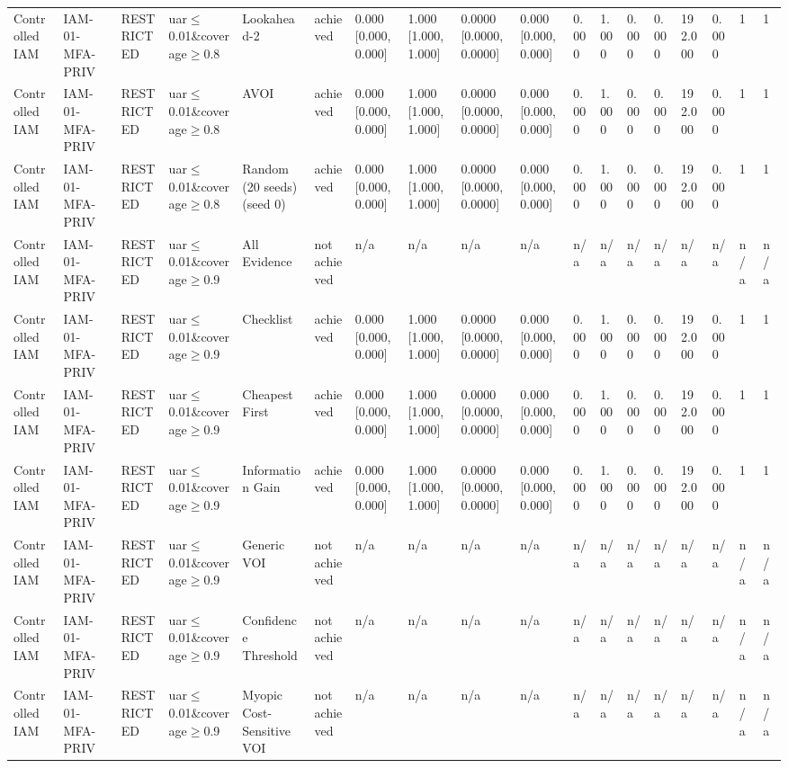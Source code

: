 \begin{table}[!ht]
{\begin{tabular}{llllllllllllllllll}
Controlled IAM & IAM-01-MFA-PRIV & RESTRICTED & uar$\le$0.01\&coverage$\ge$0.8 & Lookahead-2 & achieved & 0.000 [0.000, 0.000] & 1.000 [1.000, 1.000] & 0.0000 [0.0000, 0.0000] & 0.000 [0.000, 0.000] & 0.000 & 1.000 & 0.000 & 0.000 & 192.000 & 0.000 & 1 & 1 \\
Controlled IAM & IAM-01-MFA-PRIV & RESTRICTED & uar$\le$0.01\&coverage$\ge$0.8 & AVOI & achieved & 0.000 [0.000, 0.000] & 1.000 [1.000, 1.000] & 0.0000 [0.0000, 0.0000] & 0.000 [0.000, 0.000] & 0.000 & 1.000 & 0.000 & 0.000 & 192.000 & 0.000 & 1 & 1 \\
Controlled IAM & IAM-01-MFA-PRIV & RESTRICTED & uar$\le$0.01\&coverage$\ge$0.8 & Random (20 seeds) (seed 0) & achieved & 0.000 [0.000, 0.000] & 1.000 [1.000, 1.000] & 0.0000 [0.0000, 0.0000] & 0.000 [0.000, 0.000] & 0.000 & 1.000 & 0.000 & 0.000 & 192.000 & 0.000 & 1 & 1 \\
Controlled IAM & IAM-01-MFA-PRIV & RESTRICTED & uar$\le$0.01\&coverage$\ge$0.9 & All Evidence & not achieved & n/a & n/a & n/a & n/a & n/a & n/a & n/a & n/a & n/a & n/a & n/a & n/a \\
Controlled IAM & IAM-01-MFA-PRIV & RESTRICTED & uar$\le$0.01\&coverage$\ge$0.9 & Checklist & achieved & 0.000 [0.000, 0.000] & 1.000 [1.000, 1.000] & 0.0000 [0.0000, 0.0000] & 0.000 [0.000, 0.000] & 0.000 & 1.000 & 0.000 & 0.000 & 192.000 & 0.000 & 1 & 1 \\
Controlled IAM & IAM-01-MFA-PRIV & RESTRICTED & uar$\le$0.01\&coverage$\ge$0.9 & Cheapest First & achieved & 0.000 [0.000, 0.000] & 1.000 [1.000, 1.000] & 0.0000 [0.0000, 0.0000] & 0.000 [0.000, 0.000] & 0.000 & 1.000 & 0.000 & 0.000 & 192.000 & 0.000 & 1 & 1 \\
Controlled IAM & IAM-01-MFA-PRIV & RESTRICTED & uar$\le$0.01\&coverage$\ge$0.9 & Information Gain & achieved & 0.000 [0.000, 0.000] & 1.000 [1.000, 1.000] & 0.0000 [0.0000, 0.0000] & 0.000 [0.000, 0.000] & 0.000 & 1.000 & 0.000 & 0.000 & 192.000 & 0.000 & 1 & 1 \\
Controlled IAM & IAM-01-MFA-PRIV & RESTRICTED & uar$\le$0.01\&coverage$\ge$0.9 & Generic VOI & not achieved & n/a & n/a & n/a & n/a & n/a & n/a & n/a & n/a & n/a & n/a & n/a & n/a \\
Controlled IAM & IAM-01-MFA-PRIV & RESTRICTED & uar$\le$0.01\&coverage$\ge$0.9 & Confidence Threshold & not achieved & n/a & n/a & n/a & n/a & n/a & n/a & n/a & n/a & n/a & n/a & n/a & n/a \\
Controlled IAM & IAM-01-MFA-PRIV & RESTRICTED & uar$\le$0.01\&coverage$\ge$0.9 & Myopic Cost-Sensitive VOI & not achieved & n/a & n/a & n/a & n/a & n/a & n/a & n/a & n/a & n/a & n/a & n/a & n/a \\

\end{tabular}}
\end{table}
